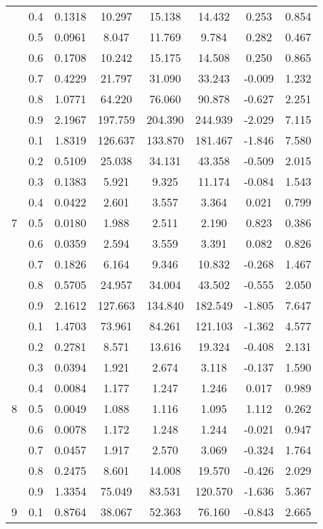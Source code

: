 \documentclass[11pt,a4paper]{report}
\begin{document}
\begin{longtable}{ | c | c || c | c | c | c | c | c | }
 & 0.4 & 0.1318 & 10.297 & 15.138 & 14.432 & 0.253 & 0.854 \\
 & 0.5 & 0.0961 & 8.047 & 11.769 & 9.784 & 0.282 & 0.467 \\
 & 0.6 & 0.1708 & 10.242 & 15.175 & 14.508 & 0.250 & 0.865 \\
 & 0.7 & 0.4229 & 21.797 & 31.090 & 33.243 & -0.009 & 1.232 \\
 & 0.8 & 1.0771 & 64.220 & 76.060 & 90.878 & -0.627 & 2.251 \\
 & 0.9 & 2.1967 & 197.759 & 204.390 & 244.939 & -2.029 & 7.115 \\
 \hline
\multirow{9}{*}{7} & 0.1 & 1.8319 & 126.637 & 133.870 & 181.467 & -1.846 & 7.580 \\
 & 0.2 & 0.5109 & 25.038 & 34.131 & 43.358 & -0.509 & 2.015 \\
 & 0.3 & 0.1383 & 5.921 & 9.325 & 11.174 & -0.084 & 1.543 \\
 & 0.4 & 0.0422 & 2.601 & 3.557 & 3.364 & 0.021 & 0.799 \\
 & 0.5 & 0.0180 & 1.988 & 2.511 & 2.190 & 0.823 & 0.386 \\
 & 0.6 & 0.0359 & 2.594 & 3.559 & 3.391 & 0.082 & 0.826 \\
 & 0.7 & 0.1826 & 6.164 & 9.346 & 10.832 & -0.268 & 1.467 \\
 & 0.8 & 0.5705 & 24.957 & 34.004 & 43.502 & -0.555 & 2.050 \\
 & 0.9 & 2.1612 & 127.663 & 134.840 & 182.549 & -1.805 & 7.647 \\
 \hline
\multirow{9}{*}{8} & 0.1 & 1.4703 & 73.961 & 84.261 & 121.103 & -1.362 & 4.577 \\
 & 0.2 & 0.2781 & 8.571 & 13.616 & 19.324 & -0.408 & 2.131 \\
 & 0.3 & 0.0394 & 1.921 & 2.674 & 3.118 & -0.137 & 1.590 \\
 & 0.4 & 0.0084 & 1.177 & 1.247 & 1.246 & 0.017 & 0.989 \\
 & 0.5 & 0.0049 & 1.088 & 1.116 & 1.095 & 1.112 & 0.262 \\
 & 0.6 & 0.0078 & 1.172 & 1.248 & 1.244 & -0.021 & 0.947 \\
 & 0.7 & 0.0457 & 1.917 & 2.570 & 3.069 & -0.324 & 1.764 \\
 & 0.8 & 0.2475 & 8.601 & 14.008 & 19.570 & -0.426 & 2.029 \\
 & 0.9 & 1.3354 & 75.049 & 83.531 & 120.570 & -1.636 & 5.367 \\
 \hline
\multirow{9}{*}{9} & 0.1 & 0.8764 & 38.067 & 52.363 & 76.160 & -0.843 & 2.665 \\

\end{longtable}
\end{document}
